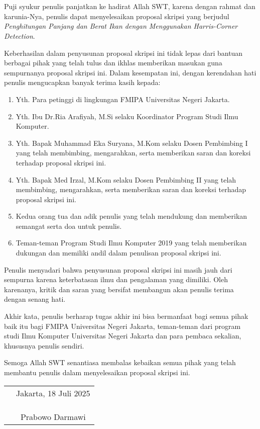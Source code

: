 \chapter*{}

Puji syukur penulis panjatkan ke hadirat Allah SWT, karena dengan rahmat dan
karunia-Nya, penulis dapat menyelesaikan proposal skripsi yang berjudul
\textit{Penghitungan Panjang dan Berat Ikan dengan Menggunakan Harris-Corner Detection}.

Keberhasilan dalam penyusunan proposal skripsi ini tidak lepas dari bantuan
berbagai pihak yang telah tulus dan ikhlas memberikan masukan guna sempurnanya proposal skripsi ini. Dalam kesempatan ini, dengan
kerendahan hati penulis mengucapkan banyak terima kasih kepada:

\begin{enumerate}
	\item{Yth. Para petinggi di lingkungan FMIPA Universitas Negeri Jakarta.}
	\item{Yth. Ibu Dr.Ria Arafiyah, M.Si selaku Koordinator Program Studi Ilmu Komputer.}
	\item{Yth. Bapak Muhammad Eka Suryana, M.Kom selaku Dosen Pembimbing I yang telah membimbing, mengarahkan, serta memberikan saran dan koreksi terhadap proposal skripsi ini.}
	\item{Yth. Bapak Med Irzal, M.Kom selaku Dosen Pembimbing II yang telah membimbing, mengarahkan, serta memberikan saran dan koreksi terhadap proposal skripsi ini.}
	\item{Kedua orang tua dan adik penulis yang telah mendukung dan memberikan semangat serta doa untuk penulis.}
	\item{Teman-teman Program Studi Ilmu Komputer 2019 yang telah memberikan dukungan dan memiliki andil dalam penulisan proposal skripsi ini.}
\end{enumerate}

Penulis menyadari bahwa penyusunan proposal skripsi ini masih jauh dari sempurna
karena keterbatasan ilmu dan pengalaman yang dimiliki. Oleh karenanya, kritik
dan saran yang bersifat membangun akan penulis terima dengan senang hati. 

Akhir kata, penulis berharap tugas akhir ini bisa bermanfaat bagi semua pihak baik itu bagi FMIPA Universitas Negeri Jakarta, teman-teman dari program studi Ilmu
Komputer Universitas Negeri Jakarta dan para pembaca sekalian, khususnya penulis sendiri.

Semoga Allah SWT senantiasa membalas kebaikan semua pihak yang telah membantu penulis dalam menyelesaikan proposal skripsi ini.

\vspace{2cm}

\begin{tabular}{p{7.5cm}c}
	&Jakarta, 18 Juli 2025 \\
	&\\
	&\\
	&\\
	&Prabowo Darmawi
\end{tabular}
